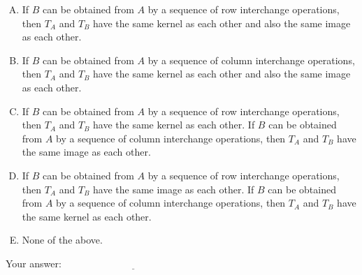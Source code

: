 \documentclass[10pt]{amsart}
\begin{document}
\begin{enumerate}
  \begin{enumerate}[(A)]
  \item If $B$ can be obtained from $A$ by a sequence of row
    interchange operations, then $T_A$ and $T_B$ have the same kernel
    as each other and also the same image as each other.
  \item If $B$ can be obtained from $A$ by a sequence of column
    interchange operations, then $T_A$ and $T_B$ have the same kernel
    as each other and also the same image as each other.
  \item If $B$ can be obtained from $A$ by a sequence of row
    interchange operations, then $T_A$ and $T_B$ have the same kernel
    as each other. If $B$ can be obtained from $A$ by a sequence of
    column interchange operations, then $T_A$ and $T_B$ have the same
    image as each other.
  \item If $B$ can be obtained from $A$ by a sequence of row
    interchange operations, then $T_A$ and $T_B$ have the same image
    as each other. If $B$ can be obtained from $A$ by a sequence of
    column interchange operations, then $T_A$ and $T_B$ have the same
    kernel as each other.
  \item None of the above.
  \end{enumerate}

  \vspace{0.1in}
  Your answer: $\underline{\qquad\qquad\qquad\qquad\qquad\qquad\qquad}$
  \vspace{0.1in}

\end{enumerate}
\end{document}
